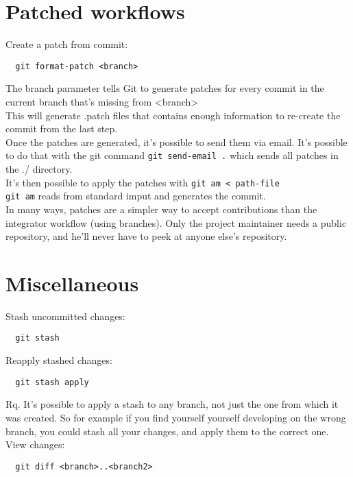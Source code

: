 \documentclass[french]{article}
\begin{document}
\section{Patched workflows}

Create a patch from commit:
\begin{verbatim}
  git format-patch <branch>
\end{verbatim}
The branch parameter tells Git to generate patches for every commit in the current branch that's missing from <branch>\\
This will generate .patch files that contains enough information to re-create the commit from the last step.\\

Once the patches are generated, it's possible to send them via email. It's possible to do that with the git command \verb|git send-email .| which sends all patches in the ./ directory.\\

It's then possible to apply the patches with \verb|git am < path-file|\\
\verb|git am| reads from standard imput and generates the commit.\\

In many ways, patches are a simpler way to accept contributions than the integrator workflow (using branches). Only the project maintainer needs a public repository, and he'll never have to peek at anyone else's repository.

\section{Miscellaneous}

Stash uncommitted changes:
\begin{verbatim}
  git stash
\end{verbatim}

Reapply stashed changes:
\begin{verbatim}
  git stash apply
\end{verbatim}
Rq. It's possible to apply a stash to any branch, not just the one from which it was created. So for example if you find yourself yourself developing on the wrong branch, you could stash all your changes, and apply them to the correct one.\\

View changes:
\begin{verbatim}
  git diff <branch>..<branch2>
\end{verbatim}
\end{document}
